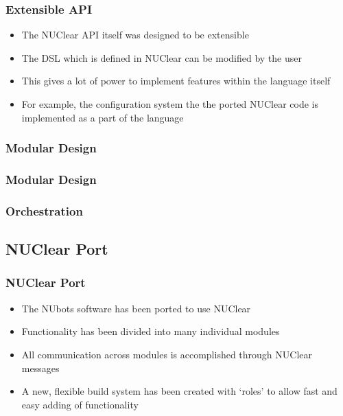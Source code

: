 \documentclass{beamer}
\begin{document}
\begin{frame}
	\frametitle{Extensible API}
	\begin{itemize}
		\item The NUClear API itself was designed to be extensible
		\item The DSL which is defined in NUClear can be modified by the user
		\item This gives a lot of power to implement features within the language itself
		\item For example, the configuration system the the ported NUClear code is implemented as a part of the language
	\end{itemize}
\end{frame}

\begin{frame}
	\frametitle{Modular Design}
\end{frame}

\begin{frame}
	\frametitle{Modular Design}
\end{frame}

\begin{frame}
	\frametitle{Orchestration}
\end{frame}




\subsection{NUClear Port}
\begin{frame}
	\frametitle{NUClear Port}

	\begin{itemize}
		\item The NUbots software has been ported to use NUClear
		\item Functionality has been divided into many individual modules
		\item All communication across modules is accomplished through NUClear messages
		\item A new, flexible build system has been created with `roles' to allow fast and easy adding of functionality
	\end{itemize}
\end{frame}
\end{document}
